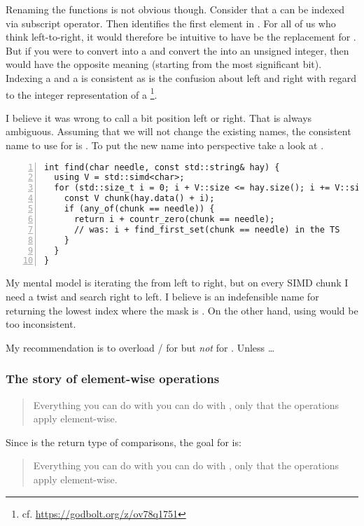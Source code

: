 Renaming the  functions is not obvious though.
Consider that a  can be indexed via subscript operator.
Then  identifies the first element in .
For all of us who think left-to-right, it would therefore be intuitive to have
 be the replacement for .
But if you were to convert  into a \std{} and convert the
 into an unsigned integer, then  would have the
opposite meaning (starting from the most significant bit).
Indexing a  and a  is consistent as is the
confusion about left and right with regard to the integer representation of a
\footnote{cf. \url{https://godbolt.org/z/ov78q1751}}.

I believe it was wrong to call a bit position left or right.
That is always ambiguous.
Assuming that we will not change the existing names, the consistent name to use
for \stdx{} is \std{}.
To put the new name into perspective take a look at .
\begin{lstlisting}[numbers=left,float={hbtp},label=lst:searchwithsimd,caption={
    SIMD algorithm to find a \code{char} in a \code{string}
}]
int find(char needle, const std::string& hay) {
  using V = std::simd<char>;
  for (std::size_t i = 0; i + V::size <= hay.size(); i += V::size) {
    const V chunk(hay.data() + i);
    if (any_of(chunk == needle)) {
      return i + countr_zero(chunk == needle);
      // was: i + find_first_set(chunk == needle) in the TS
    }
  }
}
\end{lstlisting}
My mental model is iterating the  from left to right, but on every
SIMD chunk I need a twist and search right to left.
I believe  is an indefensible name for returning the lowest
index where the mask is .
On the other hand, using  would be too inconsistent.

My recommendation is to overload / for
 but \emph{not} for .
Unless \ldots

\subsubsection{The story of element-wise operations}\label{sec:maskreductionsrename}
\begin{quote}{}
  Everything you can do with  you can do with ,
  only that the operations apply element-wise.
\end{quote}
Since  is the return type of  comparisons, the
goal for  is:
\begin{quote}{}
  Everything you can do with  you can do with ,
  only that the operations apply element-wise.
\end{quote}

